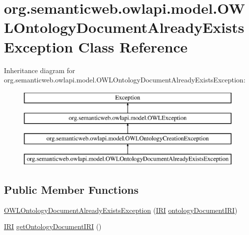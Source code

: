 \hypertarget{classorg_1_1semanticweb_1_1owlapi_1_1model_1_1_o_w_l_ontology_document_already_exists_exception}{\section{org.\-semanticweb.\-owlapi.\-model.\-O\-W\-L\-Ontology\-Document\-Already\-Exists\-Exception Class Reference}
\label{classorg_1_1semanticweb_1_1owlapi_1_1model_1_1_o_w_l_ontology_document_already_exists_exception}
}
Inheritance diagram for org.\-semanticweb.\-owlapi.\-model.\-O\-W\-L\-Ontology\-Document\-Already\-Exists\-Exception\-:\begin{figure}[H]
\begin{center}
\leavevmode
\includegraphics[height=4.000000cm]{classorg_1_1semanticweb_1_1owlapi_1_1model_1_1_o_w_l_ontology_document_already_exists_exception}
\end{center}
\end{figure}
\subsection*{Public Member Functions}
\begin{DoxyCompactItemize}
\item 
\hyperlink{classorg_1_1semanticweb_1_1owlapi_1_1model_1_1_o_w_l_ontology_document_already_exists_exception_a61b7d7dfb9d114a84db842831bd5a283}{O\-W\-L\-Ontology\-Document\-Already\-Exists\-Exception} (\hyperlink{classorg_1_1semanticweb_1_1owlapi_1_1model_1_1_i_r_i}{I\-R\-I} \hyperlink{classorg_1_1semanticweb_1_1owlapi_1_1model_1_1_o_w_l_ontology_document_already_exists_exception_a76fd2f2691f17524e0f9c483befa83ca}{ontology\-Document\-I\-R\-I})
\item 
\hyperlink{classorg_1_1semanticweb_1_1owlapi_1_1model_1_1_i_r_i}{I\-R\-I} \hyperlink{classorg_1_1semanticweb_1_1owlapi_1_1model_1_1_o_w_l_ontology_document_already_exists_exception_a8c529e687cc39d8da889309dc80c5bdc}{get\-Ontology\-Document\-I\-R\-I} ()
\end{DoxyCompactItemize}
